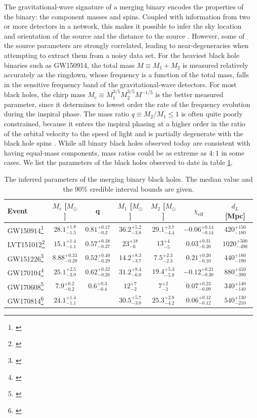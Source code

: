 \documentclass[iop,onecolumn]{revtex4}
\begin{document}
The gravitational-wave signature of a merging binary encodes the properties of the binary: the component masses and spins. Coupled with information from two or more detectors in a network, this makes it possible to infer the sky location and orientation of the source and the distance to the source \citep{Veitch:2015,GW150914:PE}.  However, some of the source parameters are strongly correlated, leading to near-degeneracies when attempting to extract them from a noisy data set.   For the heaviest black hole binaries such as GW150914, the total mass $M \equiv M_1 + M_2$ is measured relatively accurately as the ringdown, whose frequency is a function of the total mass, falls in the sensitive frequency band of the gravitational-wave detectors.  For most black holes, the chirp mass $M_c \equiv M_1^{3/5} M_2^{3/5} M^{-1/5}$ is the better measured parameter, since it determines to lowest order the rate of the frequency evolution during the inspiral phase.  The mass ratio $q\equiv M_2/M_1 \leq 1$ is often quite poorly constrained, because it enters the inspiral phasing at a higher order in the ratio of the orbital velocity to the speed of light and is partially degenerate with the black hole spins \citep[e.g.,][]{PoissonWill:1995}.  While all binary black holes observed today are consistent with having equal-mass components, mass ratios could be as extreme as $4:1$ in some cases.  We list the parameters of the black holes observed to date in table \ref{table:BHmasses}.

 
\begin{table}
\begin{tabular}{lcccccc}
Event  & $M_c$ [$M_\odot$]  & q & $M_1$ [$M_\odot$]  & $M_2$ [$M_\odot$]  & $\chi_\textrm{eff}$ & $d_L$ [Mpc] \\
\hline
GW150914\footnote{\citet{BBH:O1}} & $28.1^{+1.8}_{-1.5}$ & $0.81^{+0.17}_{-0.2}$ & $36.2^{+5.2}_{-3.8}$ & $29.1^{+3.7}_{-4.4}$ & $-0.06^{+0.14}_{-0.14}$ & $420^{+150}_{-180}$\\
LVT151012\footnote{\citet{BBH:O1}} & $15.1^{+1.4}_{-1.1}$ &$0.57^{+0.38}_{-0.37}$ &$23^{+18}_{-6}$ &$13^{+4}_{-5}$ &$0.03^{+0.31}_{-0.20}$ &$1020^{+500}_{-490}$\\
GW151226\footnote{\citet{BBH:O1}} & $8.88^{+0.33}_{-0.28}$ &$0.52^{+0.40}_{-0.29}$ &$14.2^{+8.3}_{-3.7}$ &$7.5^{+2.3}_{-2.3}$ &$0.21^{+0.20}_{-0.10}$ &$440^{+180}_{-190}$ \\
GW170104\footnote{\citet{GW170104}} & $25.1^{+2.5}_{-3.9}$ &$0.62^{+0.32}_{-0.26}$ &$31.2^{+8.4}_{-6.0}$ &$19.4^{+5.3}_{-5.9}$ &$-0.12^{+0.21}_{-0.30}$ &$880^{+450}_{-390}$\\
GW170608\footnote{\citet{GW170608}} & $7.9^{+0.2}_{-0.2}$ &$0.6^{+0.3}_{-0.4}$ &$12^{+7}_{-2}$ &$7^{+2}_{-2}$ &$0.07^{+0.23}_{-0.09}$ &$340^{+140}_{-140}$ \\
GW170814\footnote{\citet{GW170814}} & $24.1^{+1.4}_{-1.1}$ & &$30.5^{+5.7}_{-3.0}$ &$25.3^{+2.8}_{-4.2}$ &$0.06^{+0.12}_{-0.12}$ & $540^{+130}_{-210}$ \\
\hline
\end{tabular}
\caption{The inferred parameters of the merging binary black holes.  The median value and the 90\% credible interval bounds are given.}\label{table:BHmasses}
\end{table}
\end{document}
